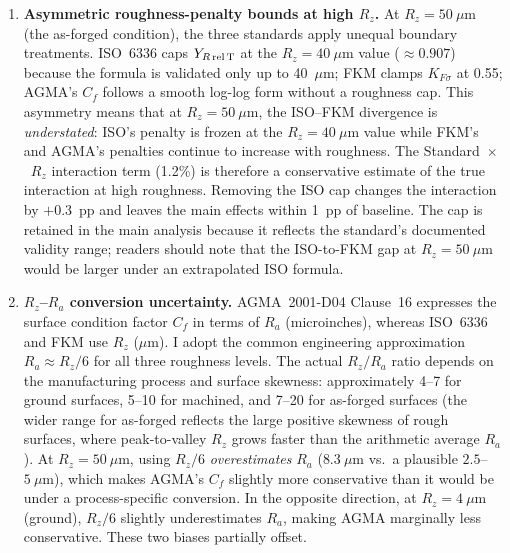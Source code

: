 \documentclass[twocolumn,12pt,a4paper]{article}
\begin{document}
\begin{enumerate}
        $+12.3$~pp (108-combination subset), while a multi-variable
        propagation sweep ($J \in [0.31, 0.35]$, $K_f \in [1.3, 1.7]$)
        gives a mean change of $-7.3$~pp with range $[-27.7, +17.8]$~pp.
        Either way the standard factor remains dominant, but a
        fully native implementation of all three standards' complete
        calculation chains is planned as Phase~2 of the research programme
        outlined at the end of this section.
  \item \textbf{Asymmetric roughness-penalty bounds at high $R_z$.} At
        $R_z = 50~\mu$m (the as-forged condition), the three standards
        apply unequal boundary treatments. ISO~6336 caps
        $Y_{R\,\rm rel\,T}$ at the $R_z = 40~\mu$m value
        ($\approx 0.907$) because the formula is validated only up to
        40~$\mu$m; FKM clamps $K_{F\sigma}$ at 0.55; AGMA's $C_f$
        follows a smooth log-log form without a roughness cap. This
        asymmetry means that at $R_z=50~\mu$m, the ISO--FKM divergence
        is \emph{understated}: ISO's penalty is frozen at the
        $R_z=40~\mu$m value while FKM's and AGMA's penalties continue
        to increase with roughness. The Standard~$\times$~$R_z$
        interaction term (1.2\%) is therefore a conservative estimate
        of the true interaction at high roughness. Removing the ISO cap
        changes the interaction by $+0.3$~pp and leaves the main
        effects within 1~pp of baseline. The cap is retained in the
        main analysis because it reflects the standard's documented
        validity range; readers should note that the ISO-to-FKM gap at
        $R_z=50~\mu$m would be larger under an extrapolated ISO formula.
  \item \textbf{$R_z$--$R_a$ conversion uncertainty.} AGMA~2001-D04
        Clause~16 expresses the surface condition factor $C_f$ in terms
        of $R_a$ (microinches), whereas ISO~6336 and FKM use $R_z$
        ($\mu$m). I adopt the common engineering approximation
        $R_a \approx R_z/6$ for all three roughness levels. The actual
        $R_z/R_a$ ratio depends on the manufacturing process and surface
        skewness: approximately 4--7 for ground surfaces, 5--10 for
        machined, and 7--20 for as-forged surfaces (the wider range for
        as-forged reflects the large positive skewness of rough
        surfaces, where peak-to-valley $R_z$ grows faster than the
        arithmetic average $R_a$). At $R_z=50~\mu$m, using $R_z/6$
        \emph{overestimates} $R_a$ ($8.3~\mu$m vs.\ a plausible
        $2.5$--$5~\mu$m), which makes AGMA's $C_f$ slightly more
        conservative than it would be under a process-specific
        conversion. In the opposite direction, at $R_z=4~\mu$m
        (ground), $R_z/6$ slightly underestimates $R_a$, making AGMA
        marginally less conservative. These two biases partially offset.


\end{enumerate}
\end{document}
